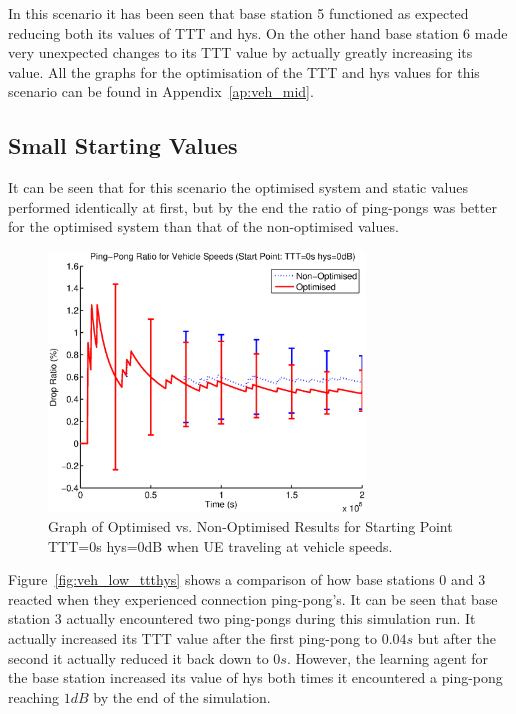 In this scenario it has been seen that base station 5 functioned as expected reducing both its values of TTT and hys. On the other hand base station 6 made very unexpected changes to its TTT value by actually greatly increasing its value. All the graphs for the optimisation of the TTT and hys values for this scenario can be found in Appendix~\ref{ap:veh_mid}.
\subsection{Small Starting Values}
It can be seen that for this scenario the optimised system and static values performed identically at first, but by the end the ratio of ping-pongs was better for the optimised system than that of the non-optimised values.
\begin{figure}[H]
  \begin{center}
    	  \includegraphics[width=0.75\textwidth]{figures/vehicle_figures/vehlow.eps}
    \end{center}
    \caption{Graph of Optimised vs. Non-Optimised Results for Starting Point TTT=0s hys=0dB when UE traveling at vehicle speeds.}
    \label{fig:veh_low_drop}
\end{figure}
Figure~\ref{fig:veh_low_ttthys} shows a comparison of how base stations 0 and 3 reacted when they experienced connection ping-pong’s. It can be seen that base station 3 actually encountered two ping-pongs during this simulation run. It actually increased its TTT value after the first ping-pong to $0.04 s$ but after the second it actually reduced it back down to $0 s$. However, the learning agent for the base station increased its value of hys both times it encountered a ping-pong reaching $1 dB$ by the end of the simulation.

